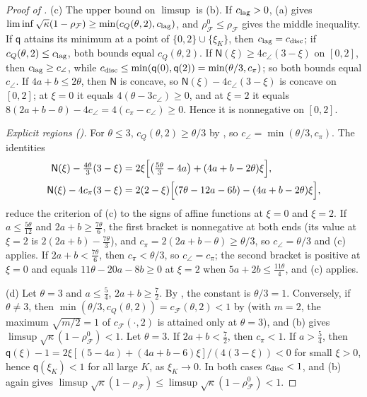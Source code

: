\documentclass[11pt]{article}
\theoremstyle{definition}
\theoremstyle{remark}
\newcommand{\cF}{\mathcal F}
\newcommand{\rhoF}{\rho_{\cF}}
\newcommand{\rhoz}{\rho_{\cF}^{0}}
\newcommand{\cQ}{c_{Q}}
\newcommand{\cFF}{c_{\cF}}
\newcommand{\clag}{c_{\rm lag}}\newcommand{\clayer}{c_{\rm layer}}\newcommand{\cdisc}{c_{\rm disc}}
\newcommand{\cpi}{c_{\pi}}
\newcommand{\ccorner}{c_{\angle}}
\begin{document}
\begin{proof}[Proof of ]
(c) The upper bound on \(\limsup\) is (b).  If \(\clag>0\), (a) gives
\(\liminf\sqrt\kappa(1-\rhoF)\ge\min(\cQ(\theta,2),\clag)\), and \(\rhoz\le\rhoF\) gives the middle inequality.  If
\(\mathsf q\) attains its minimum at a point of \(\{0,2\}\cup\{\xi_K\}\), then \(\clag=\cdisc\); if \(\cQ(\theta,2)\le\clag\), both bounds equal
\(\cQ(\theta,2)\).  If \(\mathsf N(\xi)\ge4\ccorner(3-\xi)\) on \([0,2]\), then \(\clag\ge\ccorner\), while
\(\cdisc\le\min(\mathsf q(0),\mathsf q(2))=\min(\theta/3,\cpi)\); so both bounds equal \(\ccorner\).  If \(4a+b\le2\theta\), then \(\mathsf N\) is
concave, so \(\mathsf N(\xi)-4\ccorner(3-\xi)\) is concave on \([0,2]\); at \(\xi=0\) it equals
\(4(\theta-3\ccorner)\ge0\), and at \(\xi=2\) it equals \(8(2a+b-\theta)-4\ccorner=4(\cpi-\ccorner)\ge0\).  Hence it
is nonnegative on \([0,2]\).

\emph{Explicit regions ().}  For \(\theta\le3\),
\(\cQ(\theta,2)\ge\theta/3\) by , so
\(\ccorner=\min(\theta/3,\cpi)\).  The identities
\[
\begin{aligned}
\mathsf N(\xi)-\tfrac{4\theta}3(3-\xi)&=2\xi\Bigl[\bigl(\tfrac{5\theta}3-4a\bigr)+(4a+b-2\theta)\xi\Bigr],\\
\mathsf N(\xi)-4\cpi(3-\xi)&=2(2-\xi)\Bigl[(7\theta-12a-6b)-(4a+b-2\theta)\xi\Bigr],
\end{aligned}
\]
reduce the criterion of (c) to the signs of affine functions at \(\xi=0\) and \(\xi=2\).  If
\(a\le\frac{5\theta}{12}\) and \(2a+b\ge\frac{7\theta}6\), the first bracket is nonnegative at both ends (its
value at \(\xi=2\) is \(2(2a+b)-\frac{7\theta}3\)), and \(\cpi=2(2a+b-\theta)\ge\theta/3\), so \(\ccorner=\theta/3\) and (c)
applies.  If \(2a+b<\frac{7\theta}6\), then \(\cpi<\theta/3\), so \(\ccorner=\cpi\); the second bracket is positive
at \(\xi=0\) and equals \(11\theta-20a-8b\ge0\) at \(\xi=2\) when \(5a+2b\le\frac{11\theta}4\), and (c) applies.

(d) Let \(\theta=3\) and \(a\le\frac54\), \(2a+b\ge\frac72\).  By , the constant is \(\theta/3=1\).  Conversely, if \(\theta\ne3\), then
\(\min(\theta/3,\cQ(\theta,2))=\cFF(\theta,2)<1\) by  (with \(m=2\), the maximum \(\sqrt{m/2}=1\) of \(\cFF(\cdot,2)\) is
attained only at \(\theta=3\)), and (b) gives \(\limsup\sqrt\kappa(1-\rhoz)<1\).  Let \(\theta=3\).  If \(2a+b<\frac72\),
then \(\cpi<1\).  If \(a>\frac54\), then \(\mathsf q(\xi)-1=2\xi[(5-4a)+(4a+b-6)\xi]/(4(3-\xi))<0\) for small \(\xi>0\), hence
\(\mathsf q(\xi_K)<1\) for all large \(K\), as \(\xi_K\to0\).  In both cases \(\cdisc<1\), and (b) again gives
\(\limsup\sqrt\kappa(1-\rhoF)\le\limsup\sqrt\kappa(1-\rhoz)<1\).
\end{proof}
\end{document}
